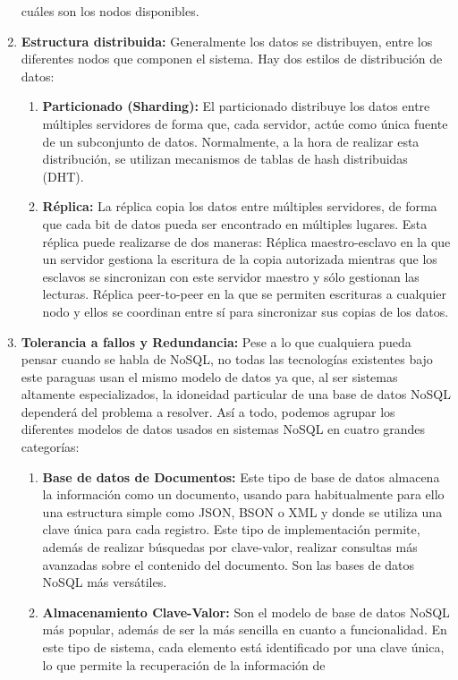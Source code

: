 \begin{enumerate}
 cuáles son los nodos disponibles.
\item \textbf{Estructura distribuida:} Generalmente los datos se 
distribuyen, entre los diferentes nodos que componen el sistema. 
Hay dos estilos de distribución de datos:
\begin{enumerate}
\item \textbf{Particionado (Sharding):} El particionado distribuye 
los datos entre múltiples servidores de forma que, cada servidor,
 actúe como única fuente de un subconjunto de datos. Normalmente, 
a la hora de realizar esta distribución, se utilizan mecanismos de tablas
 de hash distribuidas (DHT). 
\item \textbf{Réplica:} La réplica copia los datos entre múltiples 
servidores, de forma que cada bit de datos pueda ser encontrado 
en múltiples lugares. Esta réplica puede realizarse de dos maneras:
Réplica maestro-esclavo en la que un servidor gestiona la escritura
 de la copia autorizada mientras que los esclavos se sincronizan con
 este servidor maestro y sólo gestionan las lecturas.
Réplica peer-to-peer en la que se permiten escrituras a cualquier nodo 
y ellos se coordinan entre sí para sincronizar sus copias de los datos.
\end{enumerate}
\item \textbf{Tolerancia a fallos y Redundancia: } Pese a lo que 
cualquiera pueda pensar cuando se habla de NoSQL, no todas las 
tecnologías existentes bajo este paraguas usan el mismo modelo de
 datos ya que, al ser sistemas altamente especializados, la idoneidad 
particular de una base de datos NoSQL dependerá del problema
 a resolver. Así a todo, podemos agrupar los diferentes modelos de
 datos usados en sistemas NoSQL en cuatro grandes categorías:
\begin{enumerate}
\item \textbf{Base de datos de Documentos: } Este tipo de base 
de datos almacena la información como un documento, usando para
 habitualmente para ello una estructura simple como JSON, BSON o XML
 y donde se utiliza una clave única para cada registro. Este tipo de
 implementación permite, además de realizar búsquedas por clave-valor,
 realizar consultas más avanzadas sobre el contenido del documento.
 Son las bases de datos NoSQL más versátiles.
\item \textbf{Almacenamiento Clave-Valor:} Son el modelo de base de
 datos NoSQL más popular, además de ser la más sencilla en cuanto a 
funcionalidad. En este tipo de sistema, cada elemento está identificado 
por una clave única, lo que permite la recuperación de la información de

\end{enumerate}
\end{enumerate}
